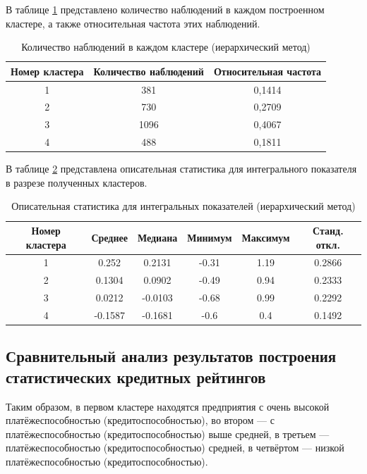 \documentclass[14pt,a4paper]{extarticle}
\begin{document}
В таблице \ref{tab:counts_hier} представлено количество наблюдений в каждом 
построенном кластере, а также относительная частота этих наблюдений.

\begin{table}[H]
    \centering
    \caption{Количество наблюдений в каждом кластере (иерархический метод)}
    \label{tab:counts_hier}
    \begin{tabular}{ccc}
        \toprule
        Номер кластера & Количество наблюдений & Относительная частота \\
        \midrule
        1 & 381  & 0,1414 \\
        2 & 730  & 0,2709 \\
        3 & 1096 & 0,4067 \\
        4 & 488  & 0,1811 \\
        \bottomrule
    \end{tabular}
\end{table}

В таблице \ref{tab:desc_hier} представлена описательная статистика для интегрального показателя 
в разрезе полученных кластеров.

\begin{table}[H]
    \centering
    \caption{Описательная статистика для интегральных показателей (иерархический метод)}
    \label{tab:desc_hier}
    \begin{tabular}{c|ccccc}
        \toprule
        Номер кластера & Среднее & Медиана & Минимум & Максимум & Станд. откл. \\
        \midrule
        1 & 0.252  & 0.2131 & -0.31 & 1.19 & 0.2866 \\
        2 & 0.1304 & 0.0902 & -0.49 & 0.94 & 0.2333 \\
        3 & 0.0212 & -0.0103& -0.68 & 0.99 & 0.2292 \\
        4 & -0.1587& -0.1681& -0.6  & 0.4  & 0.1492 \\
        \bottomrule
    \end{tabular}
\end{table}

\subsection{Сравнительный анализ результатов построения статистических кредитных 
рейтингов}

Таким образом, 
в первом кластере находятся предприятия с очень высокой платёжеспособностью 
(кредитоспособностью), 
во втором --- с платёжеспособностью (кредитоспособностью) выше средней, 
в третьем --- платёжеспособностью (кредитоспособностью) средней, 
в четвёртом --- низкой платёжеспособностью (кредитоспособностью).
\end{document}
